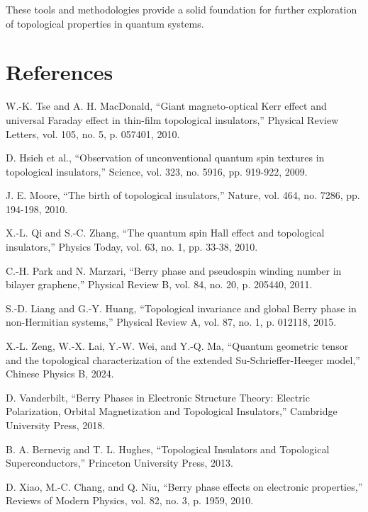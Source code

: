 \documentclass{article}
\begin{document}
These tools and methodologies provide a solid foundation for further exploration of topological properties in quantum systems.

\section{References}

\begin{thebibliography}{99}

 W.-K. Tse and A. H. MacDonald, ``Giant magneto-optical Kerr effect and universal Faraday effect in thin-film topological insulators,'' Physical Review Letters, vol. 105, no. 5, p. 057401, 2010.

 D. Hsieh et al., ``Observation of unconventional quantum spin textures in topological insulators,'' Science, vol. 323, no. 5916, pp. 919-922, 2009.

 J. E. Moore, ``The birth of topological insulators,'' Nature, vol. 464, no. 7286, pp. 194-198, 2010.

 X.-L. Qi and S.-C. Zhang, ``The quantum spin Hall effect and topological insulators,'' Physics Today, vol. 63, no. 1, pp. 33-38, 2010.

 C.-H. Park and N. Marzari, ``Berry phase and pseudospin winding number in bilayer graphene,'' Physical Review B, vol. 84, no. 20, p. 205440, 2011.

 S.-D. Liang and G.-Y. Huang, ``Topological invariance and global Berry phase in non-Hermitian systems,'' Physical Review A, vol. 87, no. 1, p. 012118, 2015.

 X.-L. Zeng, W.-X. Lai, Y.-W. Wei, and Y.-Q. Ma, ``Quantum geometric tensor and the topological characterization of the extended Su-Schrieffer-Heeger model,'' Chinese Physics B, 2024.

 D. Vanderbilt, ``Berry Phases in Electronic Structure Theory: Electric Polarization, Orbital Magnetization and Topological Insulators,'' Cambridge University Press, 2018.

 B. A. Bernevig and T. L. Hughes, ``Topological Insulators and Topological Superconductors,'' Princeton University Press, 2013.

 D. Xiao, M.-C. Chang, and Q. Niu, ``Berry phase effects on electronic properties,'' Reviews of Modern Physics, vol. 82, no. 3, p. 1959, 2010.


\end{thebibliography}
\end{document}
